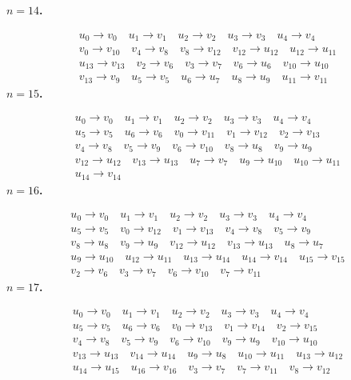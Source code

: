 \documentclass[10pt,a4paper]{article}
\begin{document}
\noindent\textbf{$n=14$.}\par\nopagebreak\[
\begin{gathered}
u_{0}\to v_{0}\quad u_{1}\to v_{1}\quad u_{2}\to v_{2}\quad u_{3}\to v_{3}\quad u_{4}\to v_{4}\\
v_{0}\to v_{10}\quad v_{4}\to v_{8}\quad v_{8}\to v_{12}\quad v_{12}\to u_{12}\quad u_{12}\to u_{11}\\
u_{13}\to v_{13}\quad v_{2}\to v_{6}\quad v_{3}\to v_{7}\quad v_{6}\to u_{6}\quad v_{10}\to u_{10}\\
v_{13}\to v_{9}\quad u_{5}\to v_{5}\quad u_{6}\to u_{7}\quad u_{8}\to u_{9}\quad u_{11}\to v_{11}
\end{gathered}\]
\noindent\textbf{$n=15$.}\par\nopagebreak\[
\begin{gathered}
u_{0}\to v_{0}\quad u_{1}\to v_{1}\quad u_{2}\to v_{2}\quad u_{3}\to v_{3}\quad u_{4}\to v_{4}\\
u_{5}\to v_{5}\quad u_{6}\to v_{6}\quad v_{0}\to v_{11}\quad v_{1}\to v_{12}\quad v_{2}\to v_{13}\\
v_{4}\to v_{8}\quad v_{5}\to v_{9}\quad v_{6}\to v_{10}\quad v_{8}\to u_{8}\quad v_{9}\to u_{9}\\
v_{12}\to u_{12}\quad v_{13}\to u_{13}\quad u_{7}\to v_{7}\quad u_{9}\to u_{10}\quad u_{10}\to u_{11}\\
u_{14}\to v_{14}
\end{gathered}\]
\noindent\textbf{$n=16$.}\par\nopagebreak\[
\begin{gathered}
u_{0}\to v_{0}\quad u_{1}\to v_{1}\quad u_{2}\to v_{2}\quad u_{3}\to v_{3}\quad u_{4}\to v_{4}\\
u_{5}\to v_{5}\quad v_{0}\to v_{12}\quad v_{1}\to v_{13}\quad v_{4}\to v_{8}\quad v_{5}\to v_{9}\\
v_{8}\to u_{8}\quad v_{9}\to u_{9}\quad v_{12}\to u_{12}\quad v_{13}\to u_{13}\quad u_{8}\to u_{7}\\
u_{9}\to u_{10}\quad u_{12}\to u_{11}\quad u_{13}\to u_{14}\quad u_{14}\to v_{14}\quad u_{15}\to v_{15}\\
v_{2}\to v_{6}\quad v_{3}\to v_{7}\quad v_{6}\to v_{10}\quad v_{7}\to v_{11}
\end{gathered}\]
\noindent\textbf{$n=17$.}\par\nopagebreak\[
\begin{gathered}
u_{0}\to v_{0}\quad u_{1}\to v_{1}\quad u_{2}\to v_{2}\quad u_{3}\to v_{3}\quad u_{4}\to v_{4}\\
u_{5}\to v_{5}\quad u_{6}\to v_{6}\quad v_{0}\to v_{13}\quad v_{1}\to v_{14}\quad v_{2}\to v_{15}\\
v_{4}\to v_{8}\quad v_{5}\to v_{9}\quad v_{6}\to v_{10}\quad v_{9}\to u_{9}\quad v_{10}\to u_{10}\\
v_{13}\to u_{13}\quad v_{14}\to u_{14}\quad u_{9}\to u_{8}\quad u_{10}\to u_{11}\quad u_{13}\to u_{12}\\
u_{14}\to u_{15}\quad u_{16}\to v_{16}\quad v_{3}\to v_{7}\quad v_{7}\to v_{11}\quad v_{8}\to v_{12}
\end{gathered}\]
\end{document}
